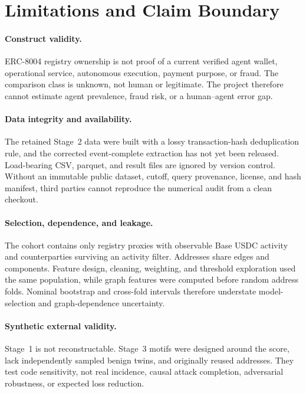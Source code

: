 \section{Limitations and Claim Boundary}\label{sec:limitations}

\paragraph{Construct validity.}
ERC-8004 registry ownership is not proof of a current verified agent wallet,
operational service, autonomous execution, payment purpose, or fraud.  The
comparison class is unknown, not human or legitimate.  The project therefore
cannot estimate agent prevalence, fraud risk, or a human--agent error gap.

\paragraph{Data integrity and availability.}
The retained Stage~2 data were built with a lossy transaction-hash deduplication
rule, and the corrected event-complete extraction has not yet been released.
Load-bearing CSV, parquet, and result files are ignored by version control.
Without an immutable public dataset, cutoff, query provenance, license, and
hash manifest, third parties cannot reproduce the numerical audit from a clean
checkout.

\paragraph{Selection, dependence, and leakage.}
The cohort contains only registry proxies with observable Base USDC activity
and counterparties surviving an activity filter.  Addresses share edges and
components.  Feature design, cleaning, weighting, and threshold exploration
used the same population, while graph features were computed before random
address folds.  Nominal bootstrap and cross-fold intervals therefore understate
model-selection and graph-dependence uncertainty.

\paragraph{Synthetic external validity.}
Stage~1 is not reconstructable.  Stage~3 motifs were designed around the score,
lack independently sampled benign twins, and originally reused addresses.
They test code sensitivity, not real incidence, causal attack completion,
adversarial robustness, or expected loss reduction.

